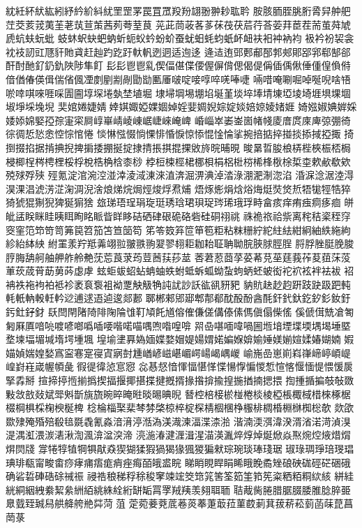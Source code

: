 紞紝紑紎紘紖紓紟紒紏紌罜罡罞罠罝罛羖羒翃翂翀耖耾耹
胺胲胹胵脁胻脀舁舯舥茳茭荄茙荑茥荖茿荁茦茜茢荂荎茛
茪茈茼荍茖茤茠茷茯茩荇荅荌荓茞茬荋茧荈虓虒蚢蚨蚖蚍
蚑蚞蚇蚗蚆蚋蚚蚅蚥蚙蚡蚧蚕蚘蚎蚝蚐蚔衃衄衭衵衶衲袀
衱衿衯袃衾衴衼訒豇豗豻貤貣赶赸趵趷趶軑軓迾迵适迿迻
逄迼迶郖郠郙郚郣郟郥郘郛郗郜郤酐酎酏釕釢釚陜陟隼飣
⾽髟⾿鬯乿偰偪偡偞偠偓偋偝偲偈偍偁偛偊偢倕偅偟偩偫
偣偤偆偀偮偳偗偑凐剫剭剬剮勖勓匭厜啵啶唼啍啐唴唪啑
啢唶唵唰啒啅唌唲啥啎唹啈唭唻啀啋圊圇埻堔埢埶埜埴堀
埭埽堈埸堋埳埏堇埮埣埲埥埬埡堎埼堐埧堁堌埱埩埰堍堄
奜婠婘婕婧婞娸娵婭婐婟婥婬婓婤婗婃婝婒婄婛婈媎娾
婍娹婌婰婩婇婑婖婂婜孲孮寁寀屙崞崋崝崚崠崌崨崍崦崥
崏崰崒崣崟崮帾帴庱庴庹庲庳弶弸徛徖徟悊悐悆悾悰悺惓
惔惏惤惙惝惈悱惛悷惊悿惃惍惀挲捥掊掂捽掽掞掭掝掗掫
掎捯掇掐据掯捵掜捭掮捼掤挻掟捸掅掁掑掍捰敓旍晥晡晛
晙晜晢朘桹梇梐梜桭桮梮梫楖桯梣梬梩桵桴梲梏桷梒桼桫
桲梪梀桱桾梛梖梋梠梉梤桸桻梑梌梊桽欶欳欷欸殑殏殍殎
殌氪淀涫涴涳湴涬淩淢涷淶淔渀淈淠淟淖涾淥淜淝淛淴淊
涽淭淰涺淕淂淏淉淐淲淓淽淗淍淣涻烺焍烷焗烴焌烰焄烳
焐烼烿焆焓焀烸烶焋焂焎牾牻牼牿猝猗猇猑猘猊猈狿猏猞
玈珶珸珵琄琁珽琇琀珺珼珿琌琋珴琈畤畣痎痒痏痋痌痑痐
皏皉盓眹眯眭眱眲眴眳眽眥眻眵硈硒硉硍硊硌砦硅硐祤祧
祩祪祣祫祡离秺秸秶秷窏窔窐笵笻笴笥笰笢笤笳笘笪笝笱
笫笭笯笲笸笚笣粔粘粖粣紵紽紸紶紺絅紬紩絁絇紾紿絊紻
紨罣羕羜羝羛翊翋翍翐翑翇翏翉耟耞耛聇聃聈脘脥脙脛脭
脟脬脞脡脕脧脝脢舑舸舳舺舴舲艴莐莣莨莍荺荳莤荴莏莁
莕莙荵莔莩荽莃莌莝莛莪莋荾莥莯莈莗莰荿莦莇莮荶虙虖
蚿蚷蛂蛁蛅蚺蚰蛈蚹蚳蚸蛌蚴蚻蚼蛃蚽蚾衒袉袕袨袢袪袚
袑袡袟袘袧袙袛袗袤袬袌袓袎覂觖觙觕訰訧訬訞谹谻豜豝
豽貥赽赻赹趼跂趹趿跁軘軞軝軜軗軠軡逤逋逑逜逌逡郯郪
郰郴郲郳郔郫郬郩酖酘酚酓酕釬釴釱釳釸釤釹釪釫釷釨釮
镺閆閈陼陭陫陱陯隿靪頄飥馗傛傕傔傞傋傣傃傌傎傝偨傜
傒傂傇兟凔匒匑厤厧喑喨喥喭啷噅喢喓喈喏喵喁喣喒喤啽
喌喦啿喕喡喎圌堩堷堙堞堧堣堨埵塈堥堜堛堳堿堶堮堹堸
堭堬堻奡媯媔媟婺媢媞婸媦婼媥媬媕媮娷媄媊媗媃媋媩婻
婽媌媜媏媓媝寪寍寋寔寑寊寎尌尰崷嵃嵫嵁嵋崿崵嵑嵎嵕
崳崺嵒崽崱嵙嵂崹嵉崸崼崲崶嵀嵅幄幁彘徦徥徫惉悹惌
惢惎惄愔惲愊愖愅惵愓惸惼惾惁愃愘愝愐惿愄愋扊掔掱掰
揎揥揨揯揃撝揳揊揠揶揕揲揵摡揟掾揝揜揄揘揓揂揇揌揋
揈揰揗揙攲敧敪敤敜敨敥斌斝斞斮旐旒晼晬晻暀晱晹晪晲
朁椌棓椄棜椪棬棪棱椏棖棷棫棤棶椓椐棳棡椇棌椈楰梴椑
棯棆椔棸棐棽棼棨椋椊椗棎棈棝棞棦棴棑椆棔棩椕椥棇欹
欻欿欼殔殗殙殕殽毰毲毳氰淼湆湇渟湉溈渼渽湅湢渫渿湁
湝湳渜渳湋湀湑渻渃渮湞湨湜湡渱渨湠湱湫渹渢渰湓湥渧
湸湤湷湕湹湒湦渵渶湚焠焞焯烻焮焱焣焥焢焲焟焨焺焛牋
牚犈犉犆犅犋猒猋猰猢猱猳猧猲猭猦猣猵猌琮琬琰琫琖琚
琡琭琱琤琣琝琩琠琲瓻甯畯畬痧痚痡痦痝痟痤痗皕皒盚睆
睇睄睍睅睊睎睋睌矞矬硠硤硥硜硭硱硪确硰硩硨硞硢祴祳
祲祰稂稊稃稌稄窙竦竤筊筇筄筈筌筎筀筘筅粢粞粨粡絘絯
絣絓絖絧絪絏絭絜絫絒絔絩絑絟絎缾缿罥罦羢羠羡翗聑聏
聐胾胔腃腊腒腏腇脽腍脺臦臮臷臸臹舄舼舽舿艵茻菏菹
萣菀菨萒菧菤菼菶萐菆菈菫菣莿萁菝菥菘菿菡菋菎菖菵菉
